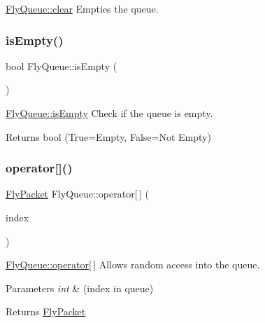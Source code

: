 \hyperlink{class_fly_queue_ae4112aad97978a82e09f6ad5cfe7f5dc}{Fly\+Queue\+::clear} Empties the queue. 

\hypertarget{class_fly_queue_ac866e43ea0e8e6aab10d4e2ca5f733f3}{}\label{class_fly_queue_ac866e43ea0e8e6aab10d4e2ca5f733f3} 
\subsubsection{\texorpdfstring{is\+Empty()}{isEmpty()}}
{\footnotesize\ttfamily bool Fly\+Queue\+::is\+Empty (\begin{DoxyParamCaption}{ }\end{DoxyParamCaption})}



\hyperlink{class_fly_queue_ac866e43ea0e8e6aab10d4e2ca5f733f3}{Fly\+Queue\+::is\+Empty} Check if the queue is empty. 

\begin{DoxyReturn}{Returns}
bool (True=Empty, False=Not Empty) 
\end{DoxyReturn}
\hypertarget{class_fly_queue_a00f38b409354127748f2093d38dee7be}{}\label{class_fly_queue_a00f38b409354127748f2093d38dee7be} 
\subsubsection{\texorpdfstring{operator[]()}{operator[]()}}
{\footnotesize\ttfamily \hyperlink{class_fly_packet}{Fly\+Packet} Fly\+Queue\+::operator\mbox{[}$\,$\mbox{]} (\begin{DoxyParamCaption}\item[{const unsigned int}]{index }\end{DoxyParamCaption})}



\hyperlink{class_fly_queue_a00f38b409354127748f2093d38dee7be}{Fly\+Queue\+::operator\mbox{[}$\,$\mbox{]}} Allows random access into the queue. 


\begin{DoxyParams}{Parameters}
{\em int} & (index in queue) \\
\hline
\end{DoxyParams}
\begin{DoxyReturn}{Returns}
\hyperlink{class_fly_packet}{Fly\+Packet} 
\end{DoxyReturn}
\hypertarget{class_fly_queue_a96b802276ccd6ce04c42da2765001603}{}\label{class_fly_queue_a96b802276ccd6ce04c42da2765001603} 
